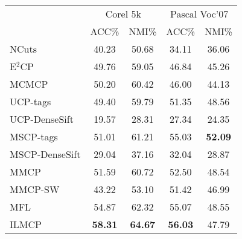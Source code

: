 \begin{table}[t]
    \label{tab4:2case}
    \centering
	\setlength{\tabcolsep}{15pt}
    \begin{tabular}{lcccc}
        \toprule
        &\multicolumn{2}{c}{Corel 5k} & \multicolumn{2}{c}{Pascal Voc'07} \\
        \cmidrule(lr){2-3}
        \cmidrule(lr){4-5}
        & ACC\% & NMI\% & ACC\% & NMI\% \\
        \midrule
        NCuts & 40.23 & 50.68 & 34.11 & 36.06 \\ 
        E$^2$CP & 49.76 & 59.05 & 46.84 & 45.26 \\ 
        MCMCP & 50.20 & 60.42 & 46.00 & 44.13 \\
        UCP-tags & 49.40 & 59.79 & 51.35 & 48.56 \\ 
        UCP-DenseSift & 19.57 & 28.31 & 27.34 & 24.35 \\ 
        MSCP-tags & 51.01 & 61.21 & 55.03 & \textbf{52.09} \\ 
        MSCP-DenseSift & 29.04 & 37.16 & 32.04 & 28.87 \\ 
        MMCP & 51.59 & 60.72 & 52.50 & 48.54 \\ 
        MMCP-SW & 43.22 & 53.10 & 51.42 & 46.99 \\  
        MFL & 54.87 & 62.32 & 55.07 & 48.55 \\ 
        ILMCP & \textbf{58.31} & \textbf{64.67} & \textbf{56.03} & 47.79 \\
        \bottomrule
    \end{tabular}
\end{table}


